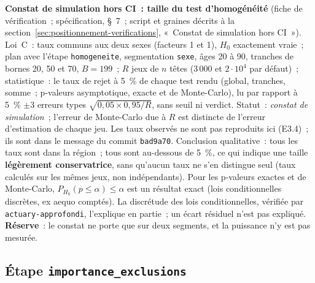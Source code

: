\documentclass[a4paper,11pt]{article}
\newcommand{\code}[1]{\texttt{\small #1}}
\begin{document}
\medskip
\noindent
\textbf{Constat de simulation hors CI~: taille du test d'homogénéité}
(fiche de vérification~; spécification, §~7~; script et graines décrits
à la section~\ref{sec:positionnement-verifications}, «~Constat de
simulation hors CI~»). Loi~C~: taux communs aux deux sexes (facteurs 1 et
1), $H_0$ exactement vraie~; plan avec l'étape \code{homogeneite},
segmentation \code{sexe}, âges 20 à 90, tranches de bornes 20, 50 et 70,
$B = 199$~; $R$ jeux de $n$ têtes (3\,000 et $2 \cdot 10^4$ par défaut)~;
statistique~: le taux de rejet à 5~\% de chaque test rendu (global,
tranches, somme~; p-valeurs asymptotique, exacte et de Monte-Carlo), lu par
rapport à 5~\% $\pm 3$ erreurs types $\sqrt{0{,}05 \times 0{,}95/R}$, sans
seuil ni verdict. Statut~: \emph{constat de simulation}~; l'erreur de
Monte-Carlo due à $R$ est distincte de l'erreur d'estimation de chaque jeu.
Les taux observés ne sont pas reproduits ici (E3.4)~; ils sont dans le
message du commit \code{bad9a70}. Conclusion qualitative~: tous les taux
sont dans la région~; tous sont au-dessous de 5~\%, ce qui indique une
taille \textbf{légèrement conservatrice}, sans qu'aucun taux ne s'en
distingue seul (taux calculés sur les mêmes jeux, non indépendants). Pour
les p-valeurs exactes et de Monte-Carlo, $P_{H_0}(p \le \alpha) \le \alpha$
est un résultat exact (lois conditionnelles discrètes, ex aequo comptés).
La discrétude des lois conditionnelles,
vérifiée par \code{actuary-approfondi}, l'explique en partie~; un écart
résiduel n'est pas expliqué. \textbf{Réserve}~: le constat ne porte que sur
deux segments, et la puissance n'y est pas mesurée.

\subsection{Étape \code{importance\_exclusions}}
\label{sec:importance-exclusions}
\end{document}

